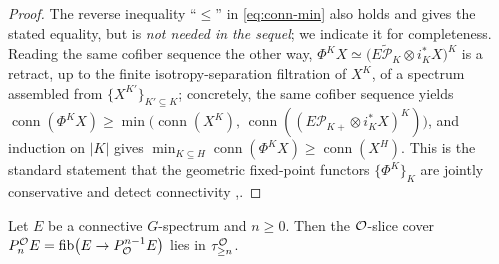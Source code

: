 \begin{proof}
The reverse inequality ``$\le$'' in \eqref{eq:conn-min} also holds and gives the
stated equality, but is \emph{not needed in the sequel}; we indicate it for
completeness. Reading the same cofiber sequence the other way,
$\Phi^K X\simeq\bigl(\widetilde{E\mathcal P_K}\otimes i_K^\ast X\bigr)^K$ is a
retract, up to the finite isotropy-separation filtration of $X^K$, of a spectrum
assembled from $\{X^{K'}\}_{K'\subseteq K}$; concretely, the same cofiber
sequence yields
$\operatorname{conn}(\Phi^K X)\ge\min\bigl(\operatorname{conn}(X^K),\,\operatorname{conn}((E\mathcal P_{K+}\otimes i_K^\ast X)^K)\bigr)$,
and induction on $|K|$ gives
$\min_{K\subseteq H}\operatorname{conn}(\Phi^K X)\ge\operatorname{conn}(X^H)$. This is the
standard statement that the geometric fixed-point functors $\{\Phi^K\}_K$ are
jointly conservative and detect connectivity
\cite[\S2.5.2]{HHR16},\cite[\S6]{HillPrimer}.
\end{proof}

\begin{qfivelemma}\label{lem:cover-conn}
Let $E$ be a connective $G$-spectrum and $n\ge 0$. Then the $\mathcal{O}$-slice cover
$P^{\mathcal{O}}_{n}E=\operatorname{fib}\bigl(E\to P^{n-1}_{\mathcal{O}} E\bigr)$ lies in
$\tau^{\mathcal{O}}_{\ge n}$.
\end{qfivelemma}

